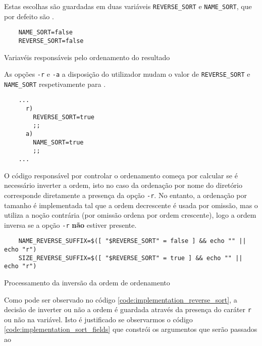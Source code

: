 Estas escolhas são guardadas em duas variáveis \Verb|REVERSE_SORT| e
\Verb|NAME_SORT|, que por defeito são .

\begin{listing}[H]
	\centering
	\begin{verbatim}
    NAME_SORT=false
    REVERSE_SORT=false
  \end{verbatim}
	\caption{Variavéis responsáveis pelo ordenamento do resultado}
\end{listing}

As opções \Verb|-r| e \Verb|-a| a disposição do utilizador mudam o valor de
\Verb|REVERSE_SORT| e \Verb|NAME_SORT| respetivamente para .

\begin{listing}[H]
	\centering
	\begin{verbatim}
    ...
      r)
        REVERSE_SORT=true
        ;;
      a)
        NAME_SORT=true
        ;;
    ...
  \end{verbatim}
	\cprotect\caption{Processamento das opções \Verb|-r| e \Verb|-a|}
\end{listing}

O código responsável por controlar o ordenamento começa por calcular se é
necessário inverter a ordem, isto no caso da ordenação por nome do diretório
corresponde diretamente a presença da opção \Verb|-r|. No entanto, a ordenação
por tamanho é implementada tal que a ordem decrescente é usada por omissão,
mas o  utiliza a noção contrária (por omissão ordena por ordem
crescente), logo a ordem inversa se a opção \Verb|-r| \textbf{não} estiver
presente.

\begin{listing}[H]
	\centering
	\begin{verbatim}
    NAME_REVERSE_SUFFIX=$([ "$REVERSE_SORT" = false ] && echo "" || echo "r")
    SIZE_REVERSE_SUFFIX=$([ "$REVERSE_SORT" = true ] && echo "" || echo "r")
  \end{verbatim}
	\caption{Processamento da inversão da ordem de ordenamento}
	\label{code:implementation_reverse_sort}
\end{listing}

Como pode ser observado no código \ref{code:implementation_reverse_sort}, a
decisão de inverter ou não a ordem é guardada através da presença do caráter
\Verb|r| ou não na variável. Isto é justificado se observarmos o código
\ref{code:implementation_sort_fields} que constrói os argumentos que serão
passados ao 

